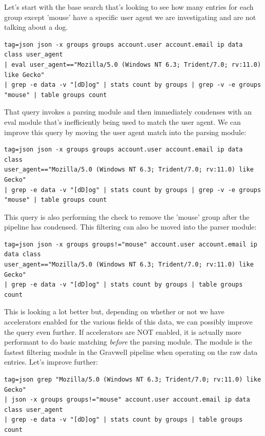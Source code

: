 Let's start with the base search that's looking to see how many entries
for each group except 'mouse' have a specific user agent we are
investigating and are not talking about a dog.

\begin{Verbatim}[breaklines=true]
tag=json json -x groups groups account.user account.email ip data class user_agent 
| eval user_agent=="Mozilla/5.0 (Windows NT 6.3; Trident/7.0; rv:11.0) like Gecko" 
| grep -e data -v "[dD]og" | stats count by groups | grep -v -e groups "mouse" | table groups count
\end{Verbatim}

That query invokes a parsing module and then immediately condenses with
an eval module that's inefficiently being used to match the user agent.
We can improve this query by moving the user agent match into the
parsing module:

\begin{Verbatim}[breaklines=true]
tag=json json -x groups groups account.user account.email ip data class 
user_agent=="Mozilla/5.0 (Windows NT 6.3; Trident/7.0; rv:11.0) like Gecko" 
| grep -e data -v "[dD]og" | stats count by groups | grep -v -e groups "mouse" | table groups count
\end{Verbatim}

This query is also performing the check to remove the 'mouse' group
after the pipeline has condensed. This filtering can also be moved into
the parser module:

\begin{Verbatim}[breaklines=true]
tag=json json -x groups groups!="mouse" account.user account.email ip data class 
user_agent=="Mozilla/5.0 (Windows NT 6.3; Trident/7.0; rv:11.0) like Gecko" 
| grep -e data -v "[dD]og" | stats count by groups | table groups count
\end{Verbatim}

This is looking a lot better but, depending on whether or not we have
accelerators enabled for the various fields of this data, we can
possibly improve the query even further. If accelerators are NOT
enabled, it is actually more performant to do basic matching \emph{before} the
parsing module. The  module is the fastest filtering module in the
Gravwell pipeline when operating on the raw data entries. Let's improve
further:

\begin{Verbatim}[breaklines=true]
tag=json grep "Mozilla/5.0 (Windows NT 6.3; Trident/7.0; rv:11.0) like Gecko" 
| json -x groups groups!="mouse" account.user account.email ip data class user_agent
| grep -e data -v "[dD]og" | stats count by groups | table groups count
\end{Verbatim}


